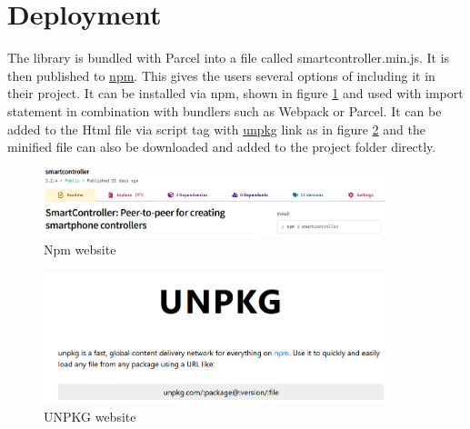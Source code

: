 \documentclass{l4proj}
\begin{document}
\section{Deployment}
The library is bundled with Parcel into a file called smartcontroller.min.js. It is then published to \href{https://www.npmjs.com/package/smartcontroller}{npm}. This gives the users several options of including it in their project. It can be installed via npm, shown in figure \ref{fig:npm} and used with import statement in combination with bundlers such as Webpack or Parcel. It can be added to the Html file via script tag with \href{https://unpkg.com/}{unpkg} link as in figure \ref{fig:unpkg} and the minified file can also be downloaded and added to the project folder directly. 

\begin{figure}[h!]
    \centering
    \includegraphics[width = 10cm]{./images/npm.png}
    \caption{Npm website}
    \label{fig:npm}
\end{figure}

\begin{figure}[h!]
    \centering
    \includegraphics[width = 10cm]{./images/unpkg.png}
    \caption{UNPKG website}
    \label{fig:unpkg}
\end{figure}
\end{document}
